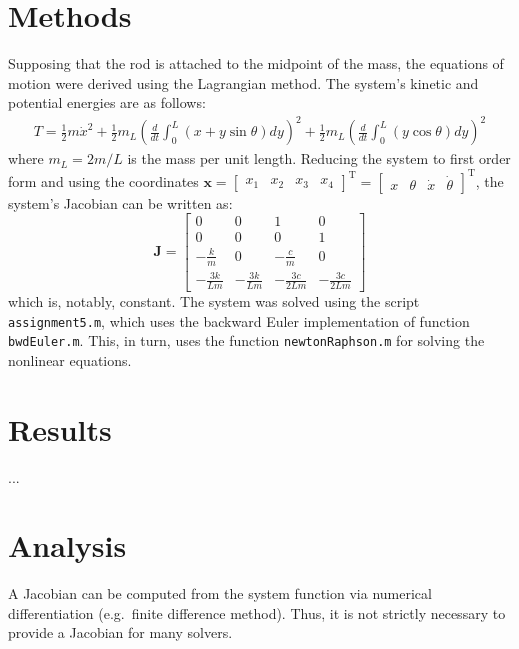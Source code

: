 \documentclass{article}
\begin{document}
	\section*{Methods}
	Supposing that the rod is attached to the midpoint of the mass, the equations of motion were derived using the Lagrangian method. The system's kinetic and potential energies are as follows:
	\begin{equation}
		\begin{aligned}
		T = \frac{1}{2} m \dot{x}^2 + \frac{1}{2} m_L \left( \frac{d}{dt} \int_{0}^{L} (x + y \sin \theta) dy \right)^2 + \frac{1}{2} m_L \left( \frac{d}{dt} \int_{0}^{L} (y \cos \theta) dy \right)^2
		\end{aligned}
	\end{equation}
	where $m_L = 2 m / L$ is the mass per unit length. Reducing the system to first order form and using the coordinates $\bm{x} = \begin{bmatrix} x_1 & x_2 & x_3 & x_4 \end{bmatrix}^\text{T} = \begin{bmatrix} x & \theta & \dot{x} & \dot{\theta} \end{bmatrix}^\text{T}$, the system's Jacobian can be written as:
	\begin{equation}
		\mathbf{J} = \begin{bmatrix}
		0 & 0 & 1 & 0 \\
		0 & 0 & 0 & 1 \\
		-\frac{k}{m} & 0 & -\frac{c}{m} & 0 \\
		-\frac{3 k}{L m} & -\frac{3 k}{L m} & -\frac{3 c}{2 L m} & -\frac{3 c}{2 L m}
		\end{bmatrix}
	\end{equation}
	which is, notably, constant. The system was solved using the script \texttt{assignment5.m}, which uses the backward Euler implementation of function \texttt{bwdEuler.m}. This, in turn, uses the function \texttt{newtonRaphson.m} for solving the nonlinear equations.
	
	\section*{Results}
	...

	\section*{Analysis}
	A Jacobian can be computed from the system function via numerical differentiation (e.g.~finite difference method). Thus, it is not strictly necessary to provide a Jacobian for many solvers.
	
\end{document}
